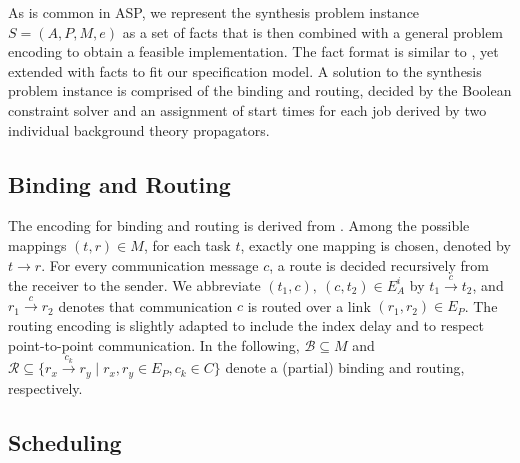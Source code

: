 As is common in ASP, we represent the synthesis problem instance $S=(A,P,M,e)$ as a set of facts that is then combined with a general problem encoding to obtain a feasible implementation. 
The fact format is similar to \cite{Andres2013}, 
yet extended with facts to fit our specification model. %
A solution to the synthesis problem instance is comprised of the binding and routing, decided by the Boolean constraint solver and an assignment of start times for each job derived by two individual background theory propagators. 


\subsection{Binding and Routing}

The encoding for binding and routing is derived from \cite{Andres2013}.
Among the possible mappings $(t,r)\in M$, for each task $t$, 
exactly one mapping is chosen, denoted by $t \rightarrow r$.
For every communication message $c$, a route is decided recursively from the receiver to the sender.
We abbreviate $(t_1,c),~(c,t_2)\in E^i_A$ by $t_1 \xrightarrow{c}t_2$,
and $r_1 \xrightarrow{c}r_2$ denotes that communication $c$ is routed over a link $(r_1,r_2)\in E_P$.
The routing encoding is slightly adapted to include the index delay 
and to respect point-to-point communication.
In the following, $\mathcal{B}\subseteq M$ and \mbox{$\mathcal{R}\subseteq \{r_x\xrightarrow{c_k}r_y\mid r_x,r_y\in E_P,c_k\in C\}$} denote a (partial) binding and routing, respectively. 
\subsection{Scheduling}
              
